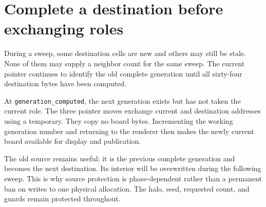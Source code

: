 \section{Complete a destination before exchanging
  roles}\label{008-life-generations-p08-complete-a-destination-before-exchanging-roles}

During a sweep, some destination cells are new and others may still be
stale. None of them may supply a neighbor count for the same sweep. The
current pointer continues to identify the old complete generation until
all sixty-four destination bytes have been computed.

At \texttt{generation\_computed}, the next generation exists but has not
taken the current role. The three pointer moves exchange current and
destination addresses using a temporary. They copy no board bytes.
Incrementing the working generation number and returning to the renderer
then makes the newly current board available for display and
publication.

The old source remains useful: it is the previous complete generation
and becomes the next destination. Its interior will be overwritten
during the following sweep. This is why source protection is
phase-dependent rather than a permanent ban on writes to one physical
allocation. The halo, seed, requested count, and guards remain protected
throughout.
